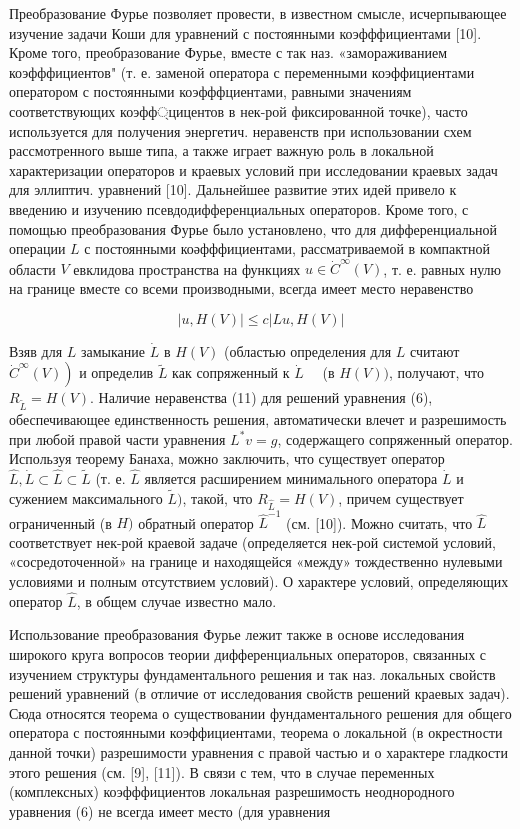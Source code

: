 \documentclass[10pt]{article}
\begin{document}
Преобразование Фурье позволяет провести, в известном смысле, исчерпывающее изучение задачи Коши для уравнений с постоянными коэфффициентами [10]. Кроме того, преобразование Фурье, вместе с так наз. «замораживанием коэфффициентов" (т. е. заменой оператора с переменными коэффициентами оператором с постоянными коэфффциентами, равными значениям соответствующих коэфф্цицентов в нек-рой фиксированной точке), часто используется для получения энергетич. неравенств при использовании схем рассмотренного выше типа, а также играет важную роль в локальной характеризации операторов и краевых условий при исследовании краевых задач для эллиптич. уравнений [10]. Дальнейшее развитие этих идей привело к введению и изучению псевдодифференциальных операторов. Кроме того, с помощью преобразования Фурье было установлено, что для дифференциальной операции $L$ с постоянными коәфффициентами, рассматриваемой в компактной области $V$ евклидова пространства на функциях $u \in \dot{C}^{\infty}(V)$, т. е. равных нулю на границе вместе со всеми производными, всегда имеет место неравенство



\[

|u, H(V)| \leqslant c|L u, H(V)|

\]



Взяв для $L$ замыкание $\dot{L}$ в $H(V)$ (областью определения для $L$ считают $\left.\dot{C}^{\infty}(V)\right)$ и определив $\tilde{L}$ как сопряженный к $\dot{L} \quad$ (в $H(V))$, получают, что $R_{\tilde{L}}=H(V)$. Наличие неравенства (11) для решений уравнения (6), обеспечивающее единственность решения, автоматически влечет и разрешимость при любой правой части уравнения $L^{*} v=g$, содержащего сопряженный оператор. Используя теорему Банаха, можно заключить, что существует оператор $\hat{L}, \dot{L} \subset \hat{L} \subset \tilde{L}$ (т. е. $\hat{L}$ является расширением минимального оператора $\dot{L}$ и сужением максимального $\tilde{L})$, такой, что $R_{\hat{L}}=H(V)$, причем существует ограниченный (в $H)$ обратный оператор $\hat{L}^{-1}$ (см. [10]). Можно считать, что $\hat{L}$ соответствует нек-рой краевой задаче (определяется нек-рой системой условий, «сосредоточенной» на границе и находящейся «между» тождественно нулевыми условиями и полным отсутствием условий). О характере условий, определяющих оператор $\hat{L}$, в общем случае известно мало.



Использование преобразования Фурье лежит также в основе исследования широкого круга вопросов теории дифференциальных операторов, связанных с изучением структуры фундаментального решения и так наз. локальных свойств решений уравнений (в отличие от исследования свойств решений краевых задач). Сюда относятся теорема о существовании фундаментального решения для общего оператора с постоянными коэффициентами, теорема о локальной (в окрестности данной точки) разрешимости уравнения с правой частью и о характере гладкости этого решения (см. [9], [11]). В связи с тем, что в случае переменных (комплексных) коэфффициентов локальная разрешимость неоднородного уравнения (6) не всегда имеет место (для уравнения
\end{document}
